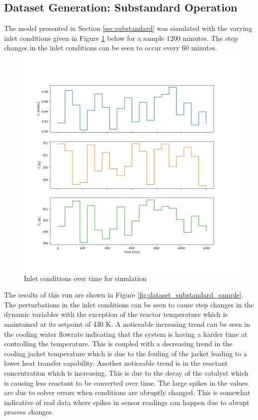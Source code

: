 \documentclass{article}
\begin{document}
\subsection{Dataset Generation: Substandard Operation}

The model presented in Section \ref{sec:substandard} was simulated with the varying inlet conditions given in Figure \ref{fig:dataset_substandard_inlet} below for a sample 1200 minutes. The step changes in the inlet conditions can be seen to occur every 60 minutes. 

\begin{figure}[H]
	\centering
	\includegraphics[width=1\textwidth]{img/dataset_substandard_inlet}
	\caption{Inlet conditions over time for simulation}
	\label{fig:dataset_substandard_inlet}
\end{figure}


The results of this run are shown in Figure \ref{fig:dataset_substandard_sample}. The perturbations in the inlet conditions can be seen to cause step changes in the dynamic variables with the exception of the reactor temperature which is maintained at its setpoint of 430 K. A noticeable increasing trend can be seen in the cooling water flowrate indicating that the system is having a harder time at controlling the temperature. This is coupled with a decreasing trend in the cooling jacket temperature which is due to the fouling of the jacket leading to a lower heat transfer capability. Another noticeable trend is in the reactant concentration which is increasing. This is due to the decay of the catalyst which is causing less reactant to be converted over time. The large spikes in the values are due to solver errors when conditions are abruptly changed. This is somewhat indicative of real data where spikes in sensor readings can happen due to abrupt process changes. 
\end{document}
